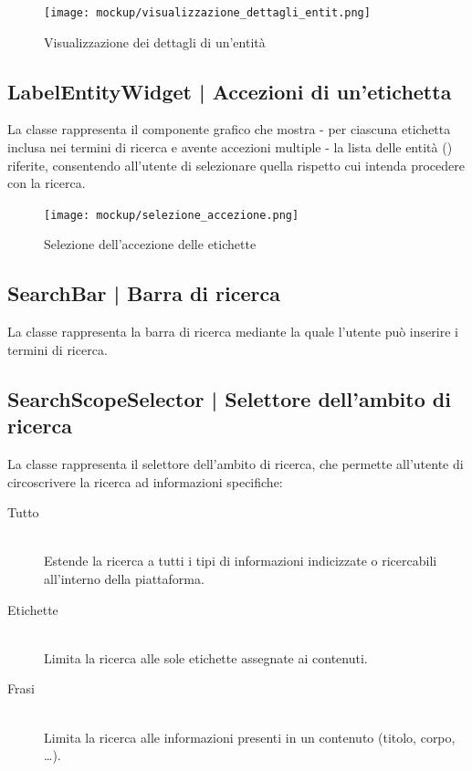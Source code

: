 \documentclass[10pt,a4paper,headinclude,footinclude,hidelinks]{scrreprt} %
\begin{document}
	\begin{figure}[ht]
		\begin{center}
	    	\texttt{[image: mockup/visualizzazione\_dettagli\_entit.png]}
			\label{gfx:mockup:entity-list}
			\caption{Visualizzazione dei dettagli di un'entità}
		\end{center}
	\end{figure}

	\subsection[LabelEntityWidget]{LabelEntityWidget | Accezioni di un'etichetta}
	\label{sec:stage:design:view.search:label-entity-list}
	La classe \textit{} rappresenta il componente grafico che mostra - per ciascuna etichetta inclusa nei termini di ricerca e avente accezioni multiple - la lista delle entità (\textit{}) riferite, consentendo all'utente di selezionare quella rispetto cui intenda procedere con la ricerca.

	\begin{figure}[ht]
		\begin{center}
	    	\texttt{[image: mockup/selezione\_accezione.png]}
			\label{gfx:mockup:label-entity}
			\caption{Selezione dell'accezione delle etichette}
		\end{center}
	\end{figure}

	\subsection[SearchBar]{SearchBar | Barra di ricerca}
	\label{sec:stage:design:view.search:search-bar}
	La classe \textit{} rappresenta la barra di ricerca mediante la quale l'utente può inserire i termini di ricerca.

	\subsection[SearchScopeSelector]{SearchScopeSelector | Selettore dell'ambito di ricerca}
	\label{sec:stage:design:view.search:search-scope-selector}
	La classe \textit{} rappresenta il selettore dell'ambito di ricerca, che permette all'utente di circoscrivere la ricerca ad informazioni specifiche:
	\begin{description}
	\item[Tutto] \hfill \\
	Estende la ricerca a tutti i tipi di informazioni indicizzate o ricercabili all'interno della piattaforma.
 	\item[Etichette] \hfill \\
	Limita la ricerca alle sole etichette assegnate ai contenuti.
	\item[Frasi] \hfill \\
	Limita la ricerca alle informazioni presenti in un contenuto (titolo, corpo, \ldots).
	\end{description}
\end{document}
